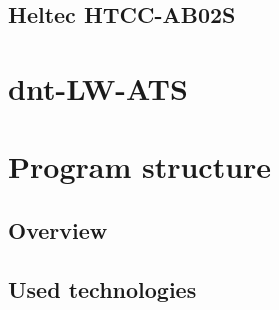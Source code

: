 
\subsection{Heltec HTCC-AB02S}


\section{dnt-LW-ATS}


\section{Program structure}

\subsection{Overview}

\subsection{Used technologies}


